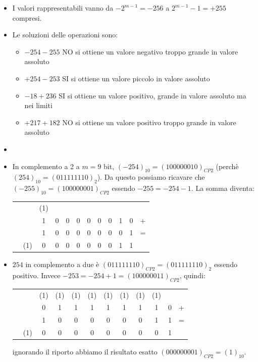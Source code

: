 \begin{Answer}[ref={ex:complemento}]
		\begin{itemize}
				\item[(a)] I valori rappresentabili vanno da $- 2^{m-1} = -256$ a $2^{m-1}-1 = +255$ compresi.
				\item[(b)] Le soluzioni delle operazioni sono:
				\begin{itemize}
						\item $-254 - 255$ NO si ottiene un valore negativo troppo grande in valore assoluto
						\item $+254 - 253$ SI si ottiene un valore piccolo in valore assoluto
						\item $- 18 + 236$ SI si ottiene un valore positivo, grande in valore assoluto ma nei limiti
						\item $+217 + 182$ NO si ottiene un valore positivo troppo grande in valore assoluto
						\end{itemize}
				\item[(c)]
						\item In complemento a 2 a $m = 9$ bit, $(-254)_{10} = (100000010)_{CP2}$ (perch\`e $(254)_{10} = (011111110)_2$). Da questo possiamo ricavare che $(-255)_{10} = (100000001)_{CP2}$ essendo $-255 = -254 - 1$. La somma diventa:\\
						\begin{table}[H]
						\centering
						\begin{tabular}{cccccccccccc}
								&& (1)\\ 
								&& 1 & 0 & 0 & 0 & 0 & 0 & 0 & 1 &0 &+\\
								&& 1 & 0 & 0 & 0 & 0 & 0 & 0 & 0 &1 &=\\
								\hline
								[1]&(1)& 0 & 0 & 0 & 0 & 0 & 0 & 0 & 1 &1 &\\
						\end{tabular}
						\end{table}
						\item $254$ in complemento a due \`e $(011111110)_{CP2} = (011111110)_2$ essendo positivo. Invece $-253 = -254 +1 = (100000011)_{CP2}$, quindi:\\
						\begin{table}[H]
						\centering
						\begin{tabular}{cccccccccccc}
								&      &(1)&(1)&(1)&(1)&(1)&(1)&(1)&(1)&  & \\
								&      & 0 & 1 & 1 & 1 & 1 & 1 & 1 & 1 &0 &+\\
								&      & 1 & 0 & 0 & 0 & 0 & 0 & 0 & 1 &1 &=\\
								\hline
								[0]&(1)& 0 & 0 & 0 & 0 & 0 & 0 & 0 & 0 &1 &\\
						\end{tabular}
						\end{table}
						ignorando il riporto abbiamo il risultato esatto $(000000001)_{CP2} = (1)_{10}$.
				\end{itemize}
\end{Answer}